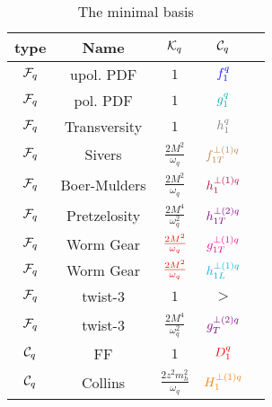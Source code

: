 \documentclass[floatfix,aps,prd,nofootinbib,superscriptaddress,preprint]{revtex4}
\newcommand\3[1]{\boldsymbol{#1}}
\begin{document}
\begin{table}[h!]
\begin{tabular}{|c|c|c|c|c|}
\hline
type       & Name         & ${\cal K}_q$                  & ${\cal C}_q$    \\\hline
${\cal F}_q$ & upol. PDF    & $1$                           & ${\color{blue} f_1^q}$          \\\hline
${\cal F}_q$ & pol. PDF     & $1$                           & $\ppdf$         \\\hline
${\cal F}_q$ & Transversity & $1$                           & $\transversity$ \\\hline
${\cal F}_q$ & Sivers       & $\frac{2M^2}{\omega_q}$       & ${\color{brown} f^{\perp(1)q}_{1T}}$       \\\hline
${\cal F}_q$ & Boer-Mulders & $\frac{2M^2}{\omega_q}$       & ${\color{purple} h^{\perp(1)q}_1 }$  \\\hline
${\cal F}_q$ & Pretzelosity & $\frac{2M^4}{\omega_q^2}$       & ${\color{violet} h^{\perp(2)q}_{1T} }$ \\\hline
${\cal F}_q$ & Worm Gear    & $\color{red}\frac{2M^2}{\omega_q}$                           & ${\color{magenta} g^{\perp (1) q}_{1T}}$          \\\hline
${\cal F}_q$ & Worm Gear    & $\color{red}\frac{2M^2}{\omega_q}$                           & ${\color{cyan}h^{\perp (1) q}_{1L}}$          \\\hline
${\cal F}_q$ & twist-3    & $1$                           & $\gt$          \\\hline
${\cal F}_q$ & twist-3  & $\frac{2M^4}{\omega_q^2}$       & ${\color{violet} g^{\perp(2)q}_{T} }$ \\\hline
\hline
${\cal C}_q$ & FF           & $1$                           & ${\color{red} D_1^{q}}$           \\\hline
${\cal C}_q$ & Collins      & $\frac{2z^2 m_h^2}{\omega_q}$ & ${\color{orange} H^{\perp(1)q}_{1} }$      \\\hline
\end{tabular}
\caption{The minimal basis}
\label{t.mbasis}
\end{table}
\end{document}
